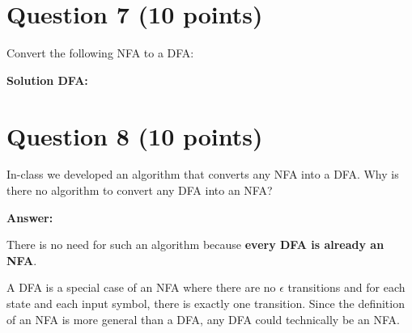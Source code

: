 \documentclass[12pt]{article}
\begin{document}
\section*{Question 7 (10 points)}

Convert the following NFA to a DFA:

\textbf{Solution DFA:}

\begin{center}
\end{center}

\section*{Question 8 (10 points)}

In-class we developed an algorithm that converts any NFA into a DFA. Why is there no algorithm to convert any DFA into an NFA?

\textbf{Answer:}

There is no need for such an algorithm because \textbf{every DFA is already an NFA}.


A DFA is a special case of an NFA where there are no $\epsilon$ transitions and for each state and each input symbol, there is exactly one transition.
Since the definition of an NFA is more general than a DFA, any DFA could technically be an NFA. 
\end{document}
